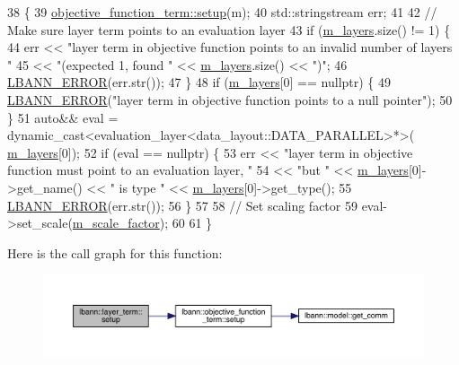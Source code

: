 \begin{DoxyCode}
38                                \{
39   \hyperlink{classlbann_1_1objective__function__term_a6c8dbdf18aac8676098189fb7b178e91}{objective\_function\_term::setup}(m);
40   std::stringstream err;
41 
42   \textcolor{comment}{// Make sure layer term points to an evaluation layer}
43   \textcolor{keywordflow}{if} (\hyperlink{classlbann_1_1objective__function__term_a9269cf0a237eacd1e220ba2739f44334}{m\_layers}.size() != 1) \{
44     err << \textcolor{stringliteral}{"layer term in objective function points to an invalid number of layers "}
45         << \textcolor{stringliteral}{"(expected 1, found "} << \hyperlink{classlbann_1_1objective__function__term_a9269cf0a237eacd1e220ba2739f44334}{m\_layers}.size() << \textcolor{stringliteral}{")"};
46     \hyperlink{base_8hpp_a80b1d707117e968a6951b7222e4b2b87}{LBANN\_ERROR}(err.str());
47   \}
48   \textcolor{keywordflow}{if} (\hyperlink{classlbann_1_1objective__function__term_a9269cf0a237eacd1e220ba2739f44334}{m\_layers}[0] == \textcolor{keyword}{nullptr}) \{
49     \hyperlink{base_8hpp_a80b1d707117e968a6951b7222e4b2b87}{LBANN\_ERROR}(\textcolor{stringliteral}{"layer term in objective function points to a null pointer"});
50   \}
51   \textcolor{keyword}{auto}&& eval = \textcolor{keyword}{dynamic\_cast<}evaluation\_layer<data\_layout::DATA\_PARALLEL>*\textcolor{keyword}{>}(
      \hyperlink{classlbann_1_1objective__function__term_a9269cf0a237eacd1e220ba2739f44334}{m\_layers}[0]);
52   \textcolor{keywordflow}{if} (eval == \textcolor{keyword}{nullptr}) \{
53     err << \textcolor{stringliteral}{"layer term in objective function must point to an evaluation layer, "}
54         << \textcolor{stringliteral}{"but "} << \hyperlink{classlbann_1_1objective__function__term_a9269cf0a237eacd1e220ba2739f44334}{m\_layers}[0]->get\_name() << \textcolor{stringliteral}{" is type "} << \hyperlink{classlbann_1_1objective__function__term_a9269cf0a237eacd1e220ba2739f44334}{m\_layers}[0]->get\_type();
55     \hyperlink{base_8hpp_a80b1d707117e968a6951b7222e4b2b87}{LBANN\_ERROR}(err.str());
56   \}
57 
58   \textcolor{comment}{// Set scaling factor}
59   eval->set\_scale(\hyperlink{classlbann_1_1objective__function__term_a59a544b8ff0455ed5091de3bf0d81c3c}{m\_scale\_factor});
60 
61 \}
\end{DoxyCode}
Here is the call graph for this function\+:\nopagebreak
\begin{figure}[H]
\begin{center}
\leavevmode
\includegraphics[width=350pt]{classlbann_1_1layer__term_ae6d84339fb80384ca2bf898fb854a7c9_cgraph}
\end{center}
\end{figure}
